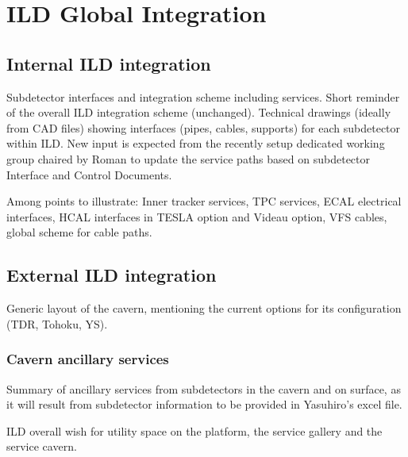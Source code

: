 \chapter{ILD Global Integration}

\vspace{2cm}

\section{Internal ILD integration}

Subdetector interfaces and integration scheme including services. Short reminder of the overall ILD integration scheme (unchanged). Technical drawings (ideally from CAD files) showing interfaces (pipes, cables, supports) for each subdetector within ILD. New input is expected from the recently setup dedicated working group chaired by Roman to update the service paths based on subdetector Interface and Control Documents.

Among points to illustrate: Inner tracker services, TPC services, ECAL electrical interfaces, HCAL interfaces in TESLA option and Videau option, VFS cables, global scheme for cable paths.   

\vspace{2cm}

\section{External ILD integration}

Generic layout of the cavern, mentioning the current options for its configuration (TDR, Tohoku, YS).

\vspace{2cm}

\subsection{Cavern ancillary services}

Summary of ancillary services from subdetectors in the cavern and on surface, as it will result from subdetector information to be provided in 
Yasuhiro's excel file.

ILD overall wish for utility space
on the platform, the service gallery 
and the service cavern.

\vspace{2cm}


